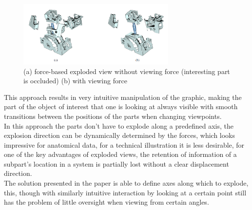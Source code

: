 \begin{figure}[tb]
	\centering
	\includegraphics[width=0.7\textwidth]{chapters/figures/motor}
	\caption{(a) force-based exploded view without viewing force (interesting part is occluded) (b) with viewing force\cite{proc:bruckner-2006-EVV}}
	\label{fig:motor}
\end{figure}
This approach results in very intuitive manipulation of the graphic, making the part of the object of interest that one is looking at always visible with smooth transitions between the positions of the parts when changing viewpoints.\\
In this approach the parts don't have to explode along a predefined axis, the explosion direction can be dynamically determined by the forces, which looks impressive for anatomical data, for a technical illustration it is less desirable, for one of the key advantages of exploded views, the retention of information of a subpart's location in a system is partially lost without a clear displacement direction.\\
The solution presented in the paper is able to define axes along which to explode, this, though with similarly intuitive interaction by looking at a certain point still has the problem of little oversight when viewing from certain angles.
